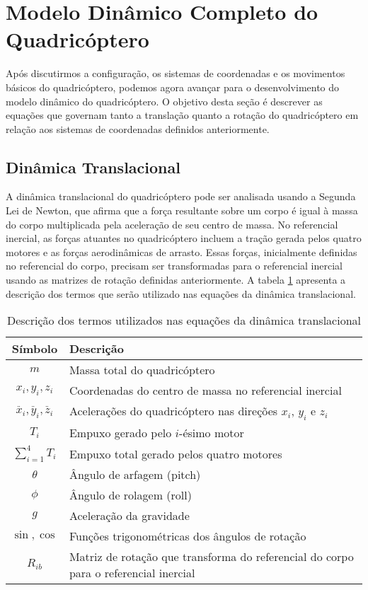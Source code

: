 \section{Modelo Dinâmico Completo do Quadricóptero}

Após discutirmos a configuração, os sistemas de coordenadas e os movimentos básicos do quadricóptero, podemos agora avançar para o desenvolvimento do modelo dinâmico do quadricóptero. O objetivo desta seção é descrever as equações que governam tanto a translação quanto a rotação do quadricóptero em relação aos sistemas de coordenadas definidos anteriormente.

\subsection{Dinâmica Translacional}

A dinâmica translacional do quadricóptero pode ser analisada usando a Segunda Lei de Newton, que afirma que a força resultante sobre um corpo é igual à massa do corpo multiplicada pela aceleração de seu centro de massa. No referencial inercial, as forças atuantes no quadricóptero incluem a tração gerada pelos quatro motores e as forças aerodinâmicas de arrasto. Essas forças, inicialmente definidas no referencial do corpo, precisam ser transformadas para o referencial inercial usando as matrizes de rotação definidas anteriormente. 
A tabela \ref{tab:termos_dinamica_translacional} apresenta a descrição dos termos que serão utilizado nas equações da dinâmica translacional.

\begin{table}[H]
	\centering
	\begin{tabular}{|c|l|}
		\hline
		\textbf{Símbolo}  & \textbf{Descrição} \\ \hline
		$m$               & Massa total do quadricóptero \\ \hline
		$x_i, y_i, z_i$   & Coordenadas do centro de massa no referencial inercial \\ \hline
		$\ddot{x_i}, \ddot{y_i}, \ddot{z_i}$ & Acelerações do quadricóptero nas direções \(x_i\), \(y_i\) e \(z_i\) \\ \hline
		$T_i$             & Empuxo gerado pelo \(i\)-ésimo motor \\ \hline
		$\sum_{i=1}^{4} T_i$ & Empuxo total gerado pelos quatro motores \\ \hline
		$\theta$          & Ângulo de arfagem (pitch) \\ \hline
		$\phi$            & Ângulo de rolagem (roll) \\ \hline
		$g$               & Aceleração da gravidade \\ \hline
		$\sin, \cos$      & Funções trigonométricas dos ângulos de rotação \\ \hline
		$R_{ib}$          & Matriz de rotação que transforma do referencial do corpo para o referencial inercial \\ \hline
	\end{tabular}
	\caption{Descrição dos termos utilizados nas equações da dinâmica translacional}
	\label{tab:termos_dinamica_translacional}
\end{table}

